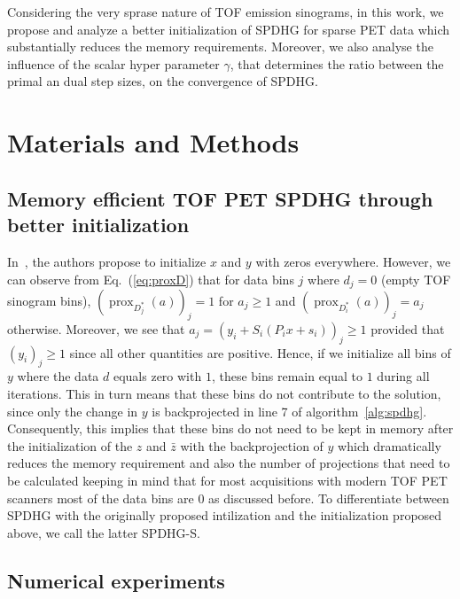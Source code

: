 \documentclass[11pt,twocolumn,twoside]{article}
\DeclareMathOperator{\prox}{prox}
\begin{document}
\smallskip

Considering the very sprase nature of TOF emission sinograms,
in this work, we propose and analyze a better initialization of SPDHG for sparse PET data
which substantially reduces the memory requirements.
Moreover, we also analyse the influence of the scalar hyper parameter $\gamma$, that determines
the ratio between the primal an dual step sizes, on the convergence of SPDHG.





\section{Materials and Methods}

\subsection{Memory efficient TOF PET SPDHG through better initialization}

In~\cite{Ehrhardt2019}, the authors propose to initialize $x$ and $y$ with zeros everywhere.
However, we can observe from Eq.~(\ref{eq:proxD}) that for data bins $j$ where $d_j = 0$ 
(empty TOF sinogram bins), 
$(\prox_{D_j^*}(a))_j = 1$ for $a_j \geq 1$ and $(\prox_{D_i^*}(a))_j = a_j$ otherwise. 
Moreover, we see that $ a_j = (y_i + S_i (P_i x + s_i) )_j \geq 1$ provided that $(y_i)_j \geq 1$ 
since all other quantities are positive. 
Hence, if we initialize all bins of $y$ where the data $d$ equals zero with $1$, 
these bins remain equal to $1$ during all iterations. 
This in turn means that these bins do not contribute to the solution, since only the change
in $y$ is backprojected in line 7 of algorithm~\ref{alg:spdhg}.
Consequently, this implies that these bins do not need to be kept in memory after the initialization
of the $z$ and $\bar{z}$ with the backprojection of $y$ which dramatically reduces the memory
requirement and also the number of projections that need to be calculated keeping in mind that
for most acquisitions with modern TOF PET scanners most of the data bins are 0 as discussed before.
To differentiate between SPDHG with the originally proposed intilization and the initialization proposed
above, we call the latter SPDHG-S.

\subsection{Numerical experiments}
\end{document}
